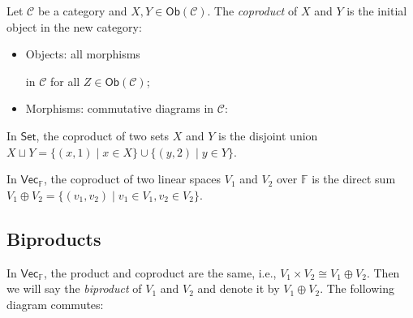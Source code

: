 \documentclass[
	11pt, %
	fleqn, %
	a4paper, %
]{LegrandOrangeBook}
\newcommand{\F}{\mathbb{F}} %
\newcommand{\C}{\mathcal{C}} %
\newcommand{\Set}{\boldsymbol{\mathsf{Set}}} %
\newcommand{\Vect}{\boldsymbol{\mathsf{Vec}}} %
\newcommand{\Ob}[1]{\mathsf{Ob}(#1)} %
\begin{document}
\begin{corollary}
    Let $\C$ be a category and $X, Y \in \Ob{\C}$. The \emph{coproduct} of $X$ and $Y$ is the initial object in the new category:
    \begin{itemize}
        \item Objects: all morphisms  in $\C$ for all $Z \in \Ob{\C}$;
        \item Morphisms: commutative diagrams in $\C$:
    \end{itemize}
    \begin{center}
    \end{center}
\end{corollary}

\begin{example}
    In $\Set$, the coproduct of two sets $X$ and $Y$ is the disjoint union $X \sqcup Y = \{ (x, 1) \mid x \in X \} \cup \{ (y, 2) \mid y \in Y \}$.
\end{example}

\begin{example}
    In $\Vect_{\F}$, the coproduct of two linear spaces $V_1$ and $V_2$ over $\F$ is the direct sum $V_1 \oplus V_2 = \{ (v_1, v_2) \mid v_1 \in V_1, v_2 \in V_2 \}$.
\end{example}

\subsection{Biproducts}

In $\Vect_{\F}$, the product and coproduct are the same, i.e., $V_1 \times V_2 \cong V_1 \oplus V_2$. Then we will say the \emph{biproduct} of $V_1$ and $V_2$ and denote it by $V_1 \oplus V_2$. The following diagram commutes:
\begin{center}
\end{center}
\end{document}
